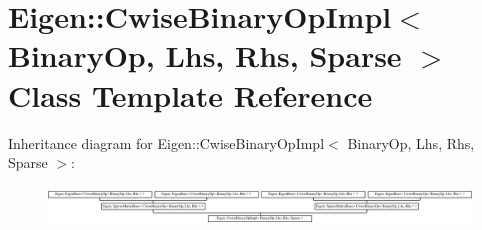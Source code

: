 \hypertarget{class_eigen_1_1_cwise_binary_op_impl_3_01_binary_op_00_01_lhs_00_01_rhs_00_01_sparse_01_4}{}\section{Eigen\+:\+:Cwise\+Binary\+Op\+Impl$<$ Binary\+Op, Lhs, Rhs, Sparse $>$ Class Template Reference}
\label{class_eigen_1_1_cwise_binary_op_impl_3_01_binary_op_00_01_lhs_00_01_rhs_00_01_sparse_01_4}
Inheritance diagram for Eigen\+:\+:Cwise\+Binary\+Op\+Impl$<$ Binary\+Op, Lhs, Rhs, Sparse $>$\+:\begin{figure}[H]
\begin{center}
\leavevmode
\includegraphics[height=1.024390cm]{class_eigen_1_1_cwise_binary_op_impl_3_01_binary_op_00_01_lhs_00_01_rhs_00_01_sparse_01_4}
\end{center}
\end{figure}
